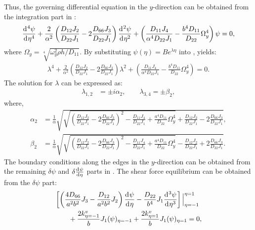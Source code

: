 \documentclass[preprint,12pt]{elsarticle}
\newcommand{\id}{\mathrm{d}\mkern1mu}
\begin{document}
%
Thus, the governing differential equation in the $y$-direction can be obtained from the integration part in :
%
\begin{equation}\label{eq:ODEy}
		\frac{\id^4 \psi}{\id \eta^4} + \frac{2}{\alpha^2}\left(\frac{D_{12}J_2}{D_{22}J_1} - 2\frac{D_{66}J_3}{D_{22}J_1}\right)\frac{\id^2 \psi}{\id \eta^2} + \left( \frac{D_{11}J_4}{\alpha^4D_{22}J_1} - \frac{b^4D_{11}}{D_{22}} \Omega_y^4 \right) \psi = 0,
\end{equation}
%
where $\Omega_y = \sqrt[4]{{\omega_y^2 \rho h}/D_{11}}$.
By substituting $\psi(\eta) = B e^{\lambda \eta}$ into , yields:
%
\begin{equation}\label{eq:ODEy2}
	\begin{split}
		\lambda^4 + \frac{2}{\alpha^2} \left( \frac{D_{12}J_2}{D_{22}J_1} - 2\frac{D_{66}J_3}{D_{22}J_1} \right) \lambda^2 + \left( \frac{D_{11}J_4}{\alpha^4D_{22}J_1} - \frac{b^4D_{11}}{D_{22}} \Omega_y^4 \right) = 0.
	\end{split}
\end{equation}
%
The solution for $\lambda$ can be expressed as:
%
\begin{equation}\label{eq:lambda}
	\begin{split}
		\lambda_{1,2} &= \pm \textit{i} \alpha_2, \qquad \lambda_{3,4} = \pm \beta_2,
	\end{split}
\end{equation}
%
where,
%
\begin{subequations}\label{eq:beta}
	\begin{align}
		\alpha_2 &= \frac{1}{\alpha} \sqrt{ \sqrt{ \left( \frac{D_{12}J_2}{D_{22}J_1} - 2\frac{D_{66}J_3}{D_{22}J_1} \right)^2 - \frac{D_{11}J_4}{D_{22}J_1} + \frac{a^4 D_{11}}{D_{22}} \Omega_y^4 } + \frac{D_{12}J_2}{D_{22}J_1} - 2 \frac{D_{66}J_3}{D_{22}J_1}}, \\
		\beta_2 &= \frac{1}{\alpha} \sqrt{ \sqrt{ \left( \frac{D_{12}J_2}{D_{22}J_1} - 2 \frac{D_{66}J_3}{D_{22}J_1} \right)^2 - \frac{D_{11}J_4}{D_{22}J_1} + \frac{a^4 D_{11}}{D_{22}} \Omega_y^4 } - \frac{D_{12}J_2}{D_{22}J_1} + 2 \frac{D_{66}J_3}{D_{22}J_1}}.
	\end{align}
\end{subequations}
%
The boundary conditions along the edges in the $y$-direction can be obtained from the remaining $\delta \psi$ and $\delta \frac{\id \psi}{\id \eta}$ parts in . 
The shear force equilibrium can be obtained from the $\delta \psi$ part:
%
\begin{equation}\label{eq:inertial_forcey}
	\begin{split}
		& \left[ \left( \frac{4D_{66}}{a^2b^2} J_3 - \frac{D_{12}}{a^2b^2} J_2 \right) \frac{\id \psi}{\id \eta} 
		- \frac{D_{22}}{b^4} J_1 \frac{\id^3 \psi}{\id \eta^3} \right] \Big|^{\eta=1}_{\eta=-1} \\
		&\qquad + \frac{2k^v_{\eta=-1}}{b} J_1 (\psi )_{\eta=-1} + \frac{2k^v_{\eta=1}}{b} J_1 (\psi )_{\eta=1} = 0,
	\end{split}
\end{equation}
\end{document}
